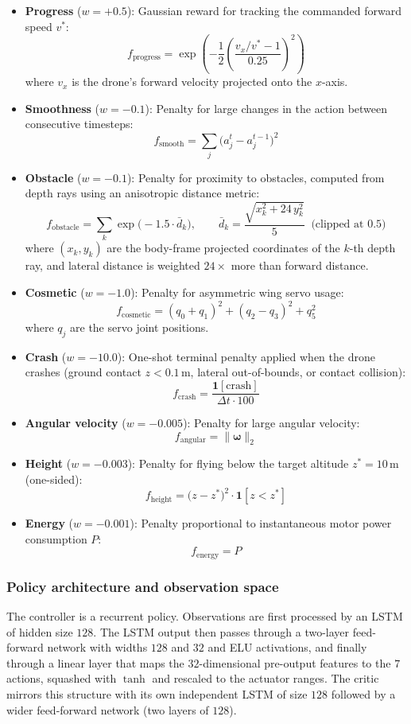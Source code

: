 \documentclass[letterpaper,10pt]{article}
\begin{document}
\begin{itemize}
    \item \textbf{Progress} ($w = +0.5$): Gaussian reward for tracking the commanded forward speed $v^*$:
    \[
        f_{\text{progress}} = \exp\!\left(-\frac{1}{2}\left(\frac{v_x / v^* - 1}{0.25}\right)^{\!2}\right)
    \]
    where $v_x$ is the drone's forward velocity projected onto the $x$-axis.

    \item \textbf{Smoothness} ($w = -0.1$): Penalty for large changes in the action between consecutive timesteps:
    \[
        f_{\text{smooth}} = \sum_{j}\bigl(a_j^t - a_j^{t-1}\bigr)^2
    \]
    \item \textbf{Obstacle} ($w = -0.1$): Penalty for proximity to obstacles, computed from depth rays using an anisotropic distance metric:
    \[
        f_{\text{obstacle}} = \sum_{k} \exp\!\bigl(-1.5 \cdot \bar{d}_k\bigr), \qquad
        \bar{d}_k = \frac{\sqrt{x_k^2 + 24\, y_k^2}}{5}
        \;\; \text{(clipped at 0.5)}
    \]
    where $(x_k, y_k)$ are the body-frame projected coordinates of the $k$-th depth ray, and lateral distance is weighted $24\times$ more than forward distance.
    \item \textbf{Cosmetic} ($w = -1.0$): Penalty for asymmetric wing servo usage:
    \[
        f_{\text{cosmetic}} = (q_0 + q_1)^2 + (q_2 - q_3)^2 + q_5^2
    \]
    where $q_j$ are the servo joint positions.
    \item \textbf{Crash} ($w = -10.0$): One-shot terminal penalty applied when the drone crashes (ground contact $z < 0.1$\,m, lateral out-of-bounds, or contact collision):
    \[
        f_{\text{crash}} = \frac{\mathbf{1}[\text{crash}]}{\Delta t \cdot 100}
    \]
    \item \textbf{Angular velocity} ($w = -0.005$): Penalty for large angular velocity:
    \[
        f_{\text{angular}} = \|\boldsymbol{\omega}\|_2
    \]
    \item \textbf{Height} ($w = -0.003$): Penalty for flying below the target altitude $z^* = 10$\,m (one-sided):
    \[
        f_{\text{height}} = \bigl(z - z^*\bigr)^2 \cdot \mathbf{1}[z < z^*]
    \]

    \item \textbf{Energy} ($w = -0.001$): Penalty proportional to instantaneous motor power consumption $P$:
    \[
        f_{\text{energy}} = P
    \]
\end{itemize}

\subsubsection{Policy architecture and observation space}
The controller is a recurrent policy. Observations are first processed by an LSTM of hidden size $128$. The LSTM output then passes through a two-layer feed-forward network with widths $128$ and $32$ and ELU activations, and finally through a linear layer that maps the $32$-dimensional pre-output features to the $7$ actions, squashed with $\tanh$ and rescaled to the actuator ranges. The critic mirrors this structure with its own independent LSTM of size $128$ followed by a wider feed-forward network (two layers of $128$).
\end{document}
